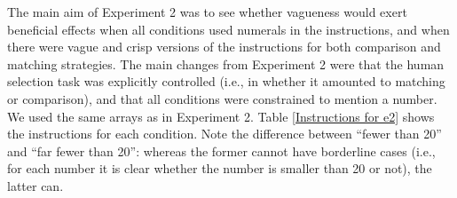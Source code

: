 
The main aim of Experiment 2 was to see whether vagueness would exert beneficial effects when all conditions used numerals in the instructions, and when there were vague and crisp versions of the instructions for both comparison and matching strategies. The main changes from Experiment 2 were that the human selection task was explicitly controlled (i.e., in whether it amounted to matching or comparison), and that all conditions were constrained to mention a number. We used the same arrays as in Experiment 2. Table \ref{Instructions for e2} shows the instructions for each condition. Note the difference between ``fewer than 20'' and ``far fewer than 20'': whereas the former cannot have borderline cases (i.e., for each number it is clear whether the number is smaller than 20 or not), the latter can.

